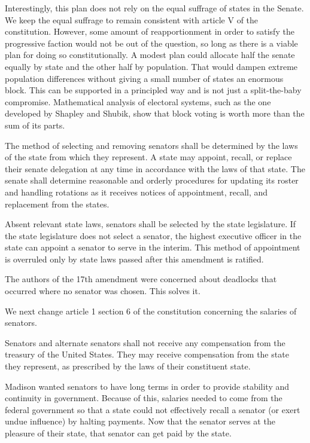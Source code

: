 \documentclass{article}
\begin{document}
Interestingly, this plan does not rely on the equal suffrage of states in the Senate. We keep the equal suffrage to remain consistent with article V of the constitution. However, some amount of reapportionment in order to satisfy the progressive faction would not be out of the question, so long as there is a viable plan for doing so constitutionally\cite{Amar}. A modest plan could allocate half the senate equally by state and the other half by population. That would dampen extreme population differences without giving a small number of states an enormous block. This can be supported in a principled way and is not just a split-the-baby compromise. Mathematical analysis of electoral systems, such as the one developed by Shapley and Shubik\cite{Shapley}, show that block voting is worth more than the sum of its parts\cite{Gross}.

\begin{quoting}
The method of selecting and removing senators shall be determined by the laws of the state from which they represent. A state may appoint, recall, or replace their senate delegation at any time in accordance with the laws of that state. The senate shall determine reasonable and orderly procedures for updating its roster and handling rotations as it receives notices of appointment, recall, and replacement from the states.

Absent relevant state laws, senators shall be selected by the state legislature. If the state legislature does not select a senator, the highest executive officer in the state can appoint a senator to serve in the interim. This method of appointment is overruled only by state laws passed after this amendment is ratified.
\end{quoting}

The authors of the 17th amendment were concerned about deadlocks that occurred where no senator was chosen. This solves it.

We next change article 1 section 6 of the constitution concerning the salaries of senators.

\begin{quoting}
Senators and alternate senators shall not receive any compensation from the treasury of the United States. They may receive compensation from the state they represent, as prescribed by the laws of their constituent state.
\end{quoting}

Madison wanted senators to have long terms in order to provide stability and continuity in government.\cite{Senate} Because of this, salaries needed to come from the federal government so that a state could not effectively recall a senator (or exert undue influence) by halting payments. Now that the senator serves at the pleasure of their state, that senator can get paid by the state.
\end{document}
